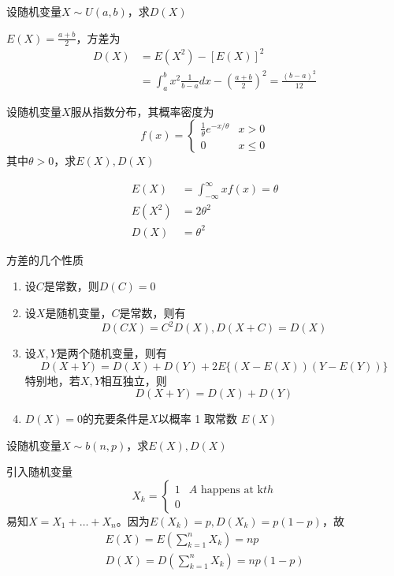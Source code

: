 \documentclass[11pt]{article}
\begin{document}
\begin{examplle}[]
设随机变量\(X\sim U(a,b)\)，求\(D(X)\)

\(E(X)=\frac{a+b}{2}\)，方差为
\begin{align*}
D(X)&=E(X^2)-[E(X)]^2\\
&=\int_a^bx^2\frac{1}{b-a}dx-(\frac{a+b}{2})^2=\frac{(b-a)^2}{12}
\end{align*}
\end{examplle}

\begin{examplle}[]
设随机变量\(X\)服从指数分布，其概率密度为
\begin{equation*}
f(x)=
\begin{cases}
\frac{1}{\theta}e^{-x/\theta}&x>0\\
0&x\le0
\end{cases}
\end{equation*}
其中\(\theta>0\)，求\(E(X),D(X)\)

\begin{align*}
E(X)&=\int_{-\infty}^\infty xf(x)=\theta\\
E(X^2)&=2\theta^2\\
D(X)&=\theta^2
\end{align*}
\end{examplle}

方差的几个性质
\begin{enumerate}
\item 设\(C\)是常数，则\(D(C)=0\)
\item 设\(X\)是随机变量，\(C\)是常数，则有
\begin{equation*}
D(CX)=C^2D(X),D(X+C)=D(X)
\end{equation*}
\item 设\(X,Y\)是两个随机变量，则有
\begin{equation*}
D(X+Y)=D(X)+D(Y)+2E\{(X-E(X))(Y-E(Y))\}
\end{equation*}
特别地，若\(X,Y\)相互独立，则
\begin{equation*}
D(X+Y)=D(X)+D(Y)
\end{equation*}
\item \(D(X)=0\)的充要条件是\(X\)以概率 1 取常数 \(E(X)\)
\end{enumerate}


\begin{examplle}[]
设随机变量\(X\sim b(n,p)\)，求\(E(X),D(X)\)

引入随机变量
\begin{equation*}
X_k=
\begin{cases}
1&A\text{ happens at k}th\\
0&
\end{cases}
\end{equation*}
易知\(X=X_1+\dots+X_n\)。因为\(E(X_k)=p,D(X_k)=p(1-p)\)，故
\begin{gather*}
E(X)=E(\sum_{k=1}^nX_k)=np\\
D(X)=D(\sum_{k=1}^n X_k)=np(1-p)
\end{gather*}
\end{examplle}
\end{document}
